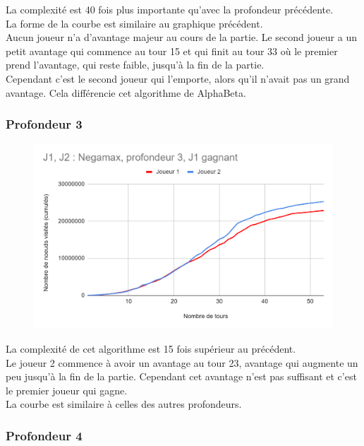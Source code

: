 \documentclass[12pt]{article}
\begin{document}
La complexité est 40 fois plus importante qu’avec la profondeur précédente.\\
La forme de la courbe est similaire au graphique précédent.\\
Aucun joueur n’a d’avantage majeur au cours de la partie. Le second joueur a un petit avantage qui commence au tour 15 et qui finit au tour 33 où le premier prend l’avantage, qui reste faible, jusqu’à la fin de la partie. \\
Cependant c’est le second joueur qui l’emporte, alors qu’il n’avait pas un grand avantage. Cela différencie cet algorithme de AlphaBeta.

\newpage
\subsubsection{Profondeur 3}

\begin{figure}[!h]
   \includegraphics[width=\textwidth]{prof3negamax.png}
\end{figure}

La complexité de cet algorithme est 15 fois supérieur au précédent.\\
Le joueur 2 commence à avoir un avantage au tour 23, avantage qui augmente un peu jusqu’à la fin de la partie. Cependant cet avantage n’est pas suffisant et c’est le premier joueur qui gagne.\\
La courbe est similaire à celles des autres profondeurs.

\newpage
\subsubsection{Profondeur 4}
\end{document}

